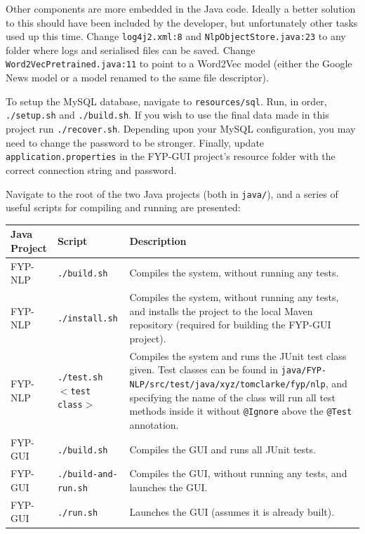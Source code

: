 \begin{appendices}
Other components are more embedded in the Java code. Ideally a better solution to this should have been included by the developer, but unfortunately other tasks used up this time. Change \texttt{log4j2.xml:8} and \texttt{NlpObjectStore.java:23} to any folder where logs and serialised files can be saved. Change \texttt{Word2VecPretrained.java:11} to point to a Word2Vec model (either the Google News model or a model renamed to the same file descriptor).

To setup the MySQL database, navigate to \texttt{resources/sql}. Run, in order, \texttt{./setup.sh} and \texttt{./build.sh}. If you wish to use the final data made in this project run \texttt{./recover.sh}. Depending upon your MySQL configuration, you may need to change the password to be stronger. Finally, update \texttt{application.properties} in the FYP-GUI project's resource folder with the correct connection string and password.

Navigate to the root of the two Java projects (both in \texttt{java/}), and a series of useful scripts for compiling and running are presented: \\

\noindent \begin{tabular}{ l | p{3.5cm} | p{9cm} }
	\textbf{Java Project} & \textbf{Script} & \textbf{Description} \\
	\hline
	FYP-NLP & \texttt{./build.sh} & Compiles the system, without running any tests. \\
	\hline
	FYP-NLP & \texttt{./install.sh} & Compiles the system, without running any tests, and installs the project to the local Maven repository (required for building the FYP-GUI project). \\
	\hline
	FYP-NLP & \texttt{./test.sh $<$test class$>$} & Compiles the system and runs the JUnit test class given. Test classes can be found in \texttt{java/FYP-NLP/src/test/java/xyz/tomclarke/fyp/nlp}, and specifying the name of the class will run all test methods inside it without \texttt{@Ignore} above the \texttt{@Test} annotation.  \\
	\hline
	FYP-GUI & \texttt{./build.sh} & Compiles the GUI and runs all JUnit tests. \\
	\hline
	FYP-GUI & \texttt{./build-and-run.sh} & Compiles the GUI, without running any tests, and launches the GUI. \\
	\hline
	FYP-GUI & \texttt{./run.sh} & Launches the GUI (assumes it is already built). \\
\end{tabular}

\end{appendices}
